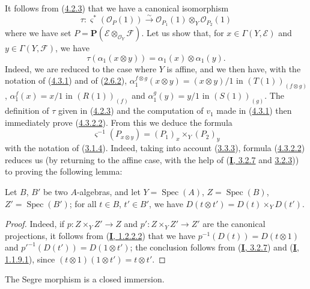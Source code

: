 \begin{env}[4.3.2]
\label{II.4.3.2}
It follows from (\hyperref[II.4.2.3]{4.2.3}) that we have a canonical
isomorphism
\[
\label{II.4.3.2.1}
  \tau:\varsigma^*(\mathcal{O}_P(1))\xrightarrow{\sim}
  \mathcal{O}_{P_1}(1)\otimes_Y\mathcal{O}_{P_2}(1)
\tag{4.3.2.1}
\]
where we have set
$P=\mathbf{P}(\mathcal{E}\otimes_{\mathcal{O}_Y}\mathcal{F})$. Let us show
that, for $x\in\Gamma(Y,\mathcal{E})$ and
$y\in\Gamma(Y,\mathcal{F})$, we have
\[
\label{II.4.3.2.2}
  \tau(\alpha_1(x\otimes y))=\alpha_1(x)\otimes\alpha_1(y).
\tag{4.3.2.2}
\]
Indeed, we are reduced to the case where $Y$ is affine, and we then have, with
the notation of (\hyperref[II.4.3.1]{4.3.1}) and of
(\hyperref[II.2.6.2]{2.6.2}),
$\alpha_1^{f\otimes g}(x\otimes y)=(x\otimes y)/1$ in
$(T(1))_{(f\otimes g)}$, $\alpha_1^f(x)=x/1$ in $(R(1))_{(f)}$ and
$\alpha_1^g(y)=y/1$ in $(S(1))_{(g)}$. The definition of $\tau$ given in
(\hyperref[II.4.2.3]{4.2.3}) and the computation of $v_1$ made in
(\hyperref[II.4.3.1]{4.3.1}) then immediately prove
(\hyperref[II.4.3.2.2]{4.3.2.2}). From this we deduce the formula
\[
\label{II.4.3.2.3}
  \varsigma^{-1}(P_{x\otimes y})=(P_1)_x\times_Y(P_2)_y
\tag{4.3.2.3}
\]
with the notation of (\hyperref[II.3.1.4]{3.1.4}). Indeed, taking into account
(\hyperref[II.3.3.3]{3.3.3}), formula
(\hyperref[II.4.3.2.2]{4.3.2.2}) reduces us (by returning to the affine case,
with the help of (\hyperref[I.3.2.7]{\textbf{I}, 3.2.7} and
\hyperref[I.3.2.3]{3.2.3})) to proving the following lemma:

\begin{lemma}[4.3.2.4]
\label{II.4.3.2.4}
Let $B$, $B'$ be two $A$-algebras, and let
$Y=\operatorname{Spec}(A)$, $Z=\operatorname{Spec}(B)$,
$Z'=\operatorname{Spec}(B')$; for all $t\in B$, $t'\in B'$, we have
$D(t\otimes t')=D(t)\times_YD(t')$.
\end{lemma}

\begin{proof}
Indeed, if $p:Z\times_YZ'\to Z$ and $p':Z\times_YZ'\to Z'$ are the
canonical projections, it follows from
(\hyperref[I.1.2.2.2]{\textbf{I}, 1.2.2.2}) that we have
$p^{-1}(D(t))=D(t\otimes1)$ and
$p'^{-1}(D(t'))=D(1\otimes t')$; the conclusion follows from
(\hyperref[I.3.2.7]{\textbf{I}, 3.2.7}) and
(\hyperref[I.1.1.9.1]{\textbf{I}, 1.1.9.1}), since
$(t\otimes1)(1\otimes t')=t\otimes t'$.
\end{proof}
\end{env}

\begin{proposition}[4.3.3]
\label{II.4.3.3}
The Segre morphism is a closed immersion.
\end{proposition}

